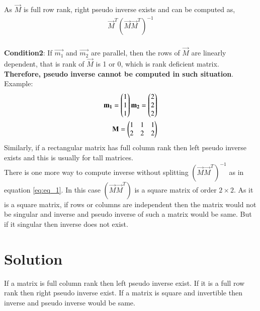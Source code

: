 \documentclass[journal,12pt,twocolumn]{IEEEtran}
\begin{document}
As $\vec{M}$ is full row rank, right pseudo inverse exists and can be computed as,\\
\begin{align}
    \vec{M}^T(\vec{M}\vec{M}^T)^{-1}
\end{align}
\\
\textbf{Condition2}: If $\vec{m_1}$ and $\vec{m_2}$ are parallel, then the rows of $\vec{M}$ are linearly dependent, that is rank of $\vec{M}$ is 1 or 0, which is rank deficient matrix. \textbf{Therefore, pseudo inverse cannot be computed in such situation}.\\
Example:
\begin{align}
    \mathbf{m_1} = \begin{pmatrix}1\\1\\1\end{pmatrix}
    \mathbf{m_2} = \begin{pmatrix}2\\2\\2\end{pmatrix}\\
    \mathbf{M} = \begin{pmatrix}1&1&1\\2&2&2\end{pmatrix}
\end{align}
Similarly, if a rectangular matrix has full column rank then left pseudo inverse exists and this is usually for tall matrices.\\

There is one more way to compute inverse without splitting $(\vec{M}\vec{M}^T)^{-1}$ as in equation \eqref{eq:eq_1}. In this case $(\vec{M}\vec{M}^T)$ is a square matrix of order $2\times 2$. As it is a square matrix, if rows or columns are independent then the matrix would not be singular and inverse and pseudo inverse of such a matrix would be same. But if it singular then inverse does not exist.

\section{Solution}

If a matrix is full column rank then left pseudo inverse exist. If it is a full row rank then right pseudo inverse exist. If a matrix is square and invertible then inverse and pseudo inverse would be same.

\\
\end{document}
